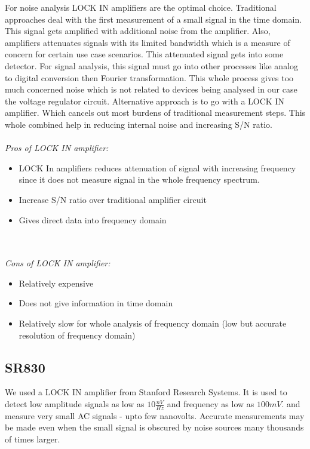 \documentclass[12pt]{article}
\begin{document}
For noise analysis LOCK IN amplifiers are the optimal choice. Traditional approaches deal with the first measurement of a small signal in the time domain. This signal gets amplified with additional noise from the amplifier. Also, amplifiers attenuates signals with its limited bandwidth which is a measure of concern for certain use case scenarios. This attenuated signal gets into some detector. For signal analysis, this signal must go into other  processes like analog to digital conversion then Fourier transformation. This whole process gives too much concerned noise which is not related to devices being analysed in our case the voltage regulator circuit. Alternative approach is to go with a LOCK IN amplifier. Which cancels out most burdens of traditional measurement steps. This whole combined help in reducing internal noise and increasing S/N ratio.
\\
\\
\emph{\large Pros of LOCK IN amplifier:}
\begin{itemize}
\item LOCK In amplifiers reduces attenuation of signal with increasing frequency since it does not measure signal in the whole frequency spectrum.
\item Increase S/N ratio over traditional amplifier circuit
\item Gives direct data into frequency domain
\end{itemize}\\
\\
\emph {\large Cons of LOCK IN amplifier:}
\begin{itemize}
\item Relatively expensive
\item Does not give information in time domain
\item Relatively slow for whole analysis of frequency domain (low but accurate resolution of frequency domain)
\end{itemize}

\subsection{SR830}

We used a LOCK IN amplifier from Stanford Research Systems. It is used to detect low amplitude signals as low as $10\frac{nV}{Hz}$ and frequency as low as $100mV$.  and measure very small AC signals - upto few nanovolts. Accurate measurements may be made even when the small signal is obscured by noise sources many thousands of times larger.
\end{document}
